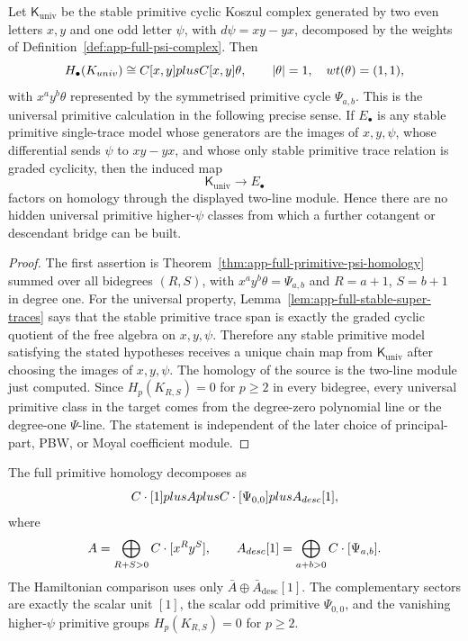 \begin{thm}
\label{thm:app-full-universal-primitive-descendant}
  Let \(\mathsf K_{\mathrm{univ}}\) be the stable primitive cyclic Koszul
  complex generated by two even letters \(x,y\) and one odd letter
  \(\psi\), with \(d\psi=xy-yx\), decomposed by the weights of
  Definition~\ref{def:app-full-psi-complex}.  Then
  \[
    H_\bullet(K_{univ})
      \cong
      C[x,y]plusC[x,y]\theta,\qquad
      |\theta|=1,\quad wt(\theta)=(1,1),
  \]
  with \(x^ay^b\theta\) represented by the symmetrised primitive cycle
  \(\Psi_{a,b}\).  This is the universal primitive calculation in the
  following precise sense.  If \(E_\bullet\) is any stable primitive
  single-trace model whose generators are the images of \(x,y,\psi\), whose
  differential sends \(\psi\) to \(xy-yx\), and whose only stable primitive
  trace relation is graded cyclicity, then the induced map
  \[
    \mathsf K_{\mathrm{univ}}\longrightarrow E_\bullet
  \]
  factors on homology through the displayed two-line module.  Hence there
  are no hidden universal primitive higher-\(\psi\) classes from which a
  further cotangent or descendant bridge can be built.
\end{thm}

\begin{proof}
  The first assertion is Theorem~\ref{thm:app-full-primitive-psi-homology}
  summed over all bidegrees \((R,S)\), with
  \(x^ay^b\theta=\Psi_{a,b}\) and \(R=a+1\), \(S=b+1\) in degree one.
  For the universal property,
  Lemma~\ref{lem:app-full-stable-super-traces} says that the stable
  primitive trace span is exactly the graded cyclic quotient of the free
  algebra on \(x,y,\psi\).  Therefore any stable primitive model satisfying
  the stated hypotheses receives a unique chain map from
  \(\mathsf K_{\mathrm{univ}}\) after choosing the images of \(x,y,\psi\).
  The homology of the source is the two-line module just computed.  Since
  \(H_p(K_{R,S})=0\) for \(p\ge2\) in every bidegree, every universal
  primitive class in the target comes from the degree-zero polynomial line
  or the degree-one \(\Psi\)-line.  The statement is independent of the
  later choice of principal-part, PBW, or Moyal coefficient module.
\end{proof}

\begin{thm}
\label{thm:app-full-hamiltonian-sector-extraction}
  The full primitive homology decomposes as
  \[
    C\cdot[1]plus A
      plus C\cdot[\Psi_{0,0}]
      plus A_{desc}[1],
  \]
  where
  \[
    A=\bigoplus_{R+S>0}C\cdot[x^Ry^S],
    \qquad
    A_{desc}[1]
      =\bigoplus_{a+b>0}C\cdot[\Psi_{a,b}].
  \]
  The Hamiltonian comparison uses only
  \(\bar A\oplus\bar A_{\mathrm{desc}}[1]\).  The complementary sectors
  are exactly the scalar unit \([1]\), the scalar odd primitive
  \(\Psi_{0,0}\), and the vanishing higher-\(\psi\) primitive groups
  \(H_p(K_{R,S})=0\) for \(p\geq2\).
\end{thm}

